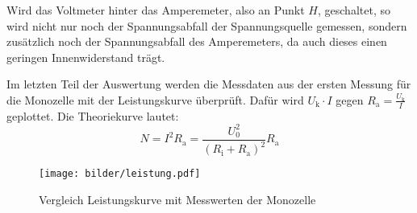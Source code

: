 Wird das Voltmeter hinter das Amperemeter, also an Punkt $H$, geschaltet, so wird
nicht nur noch der Spannungsabfall der Spannungsquelle gemessen, sondern zusätzlich
noch der Spannungsabfall des Amperemeters, da auch dieses einen geringen Innenwiderstand
trägt.

Im letzten Teil der Auswertung werden die Messdaten aus der ersten Messung für die Monozelle
mit der Leistungskurve überprüft. Dafür wird $U_\text{k} \cdot I$ gegen $R_\text{a} = \frac{U_\text{k}}{I}$
geplottet. Die Theoriekurve lautet:
\begin{equation}
  N = I^2 R_\text{a} = \frac{U_\text{0}^2}{(R_\text{i}+ R_\text{a})^2} R_\text{a}
\end{equation}

\begin{figure}[!h]
  \centering
  \texttt{[image: bilder/leistung.pdf]}
  \caption{Vergleich Leistungskurve mit Messwerten der Monozelle}
  \label{fig:leistung}
\end{figure}

